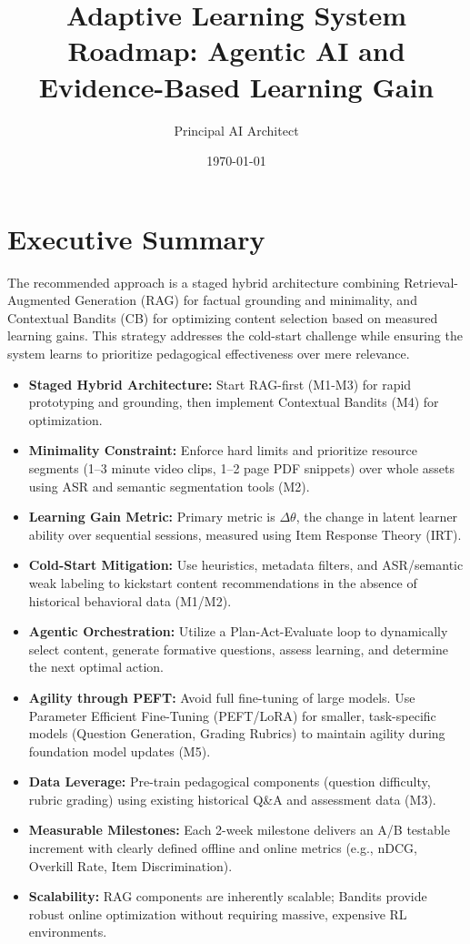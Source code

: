 \documentclass[12pt]{article}
\title{\textbf{Adaptive Learning System Roadmap: Agentic AI and Evidence-Based Learning Gain}}
\author{Principal AI Architect}
\date{\today}
\begin{document}
\maketitle
\thispagestyle{empty}

\tableofcontents
\newpage

\section{Executive Summary}

The recommended approach is a staged hybrid architecture combining Retrieval-Augmented Generation (RAG) for factual grounding and minimality, and Contextual Bandits (CB) for optimizing content selection based on measured learning gains. This strategy addresses the cold-start challenge while ensuring the system learns to prioritize pedagogical effectiveness over mere relevance.

\begin{itemize}[noitemsep]
    \item \textbf{Staged Hybrid Architecture:} Start RAG-first (M1-M3) for rapid prototyping and grounding, then implement Contextual Bandits (M4) for optimization.
    \item \textbf{Minimality Constraint:} Enforce hard limits and prioritize resource segments (1--3 minute video clips, 1--2 page PDF snippets) over whole assets using ASR and semantic segmentation tools (M2).
    \item \textbf{Learning Gain Metric:} Primary metric is $\Delta\theta$, the change in latent learner ability over sequential sessions, measured using Item Response Theory (IRT).
    \item \textbf{Cold-Start Mitigation:} Use heuristics, metadata filters, and ASR/semantic weak labeling to kickstart content recommendations in the absence of historical behavioral data (M1/M2).
    \item \textbf{Agentic Orchestration:} Utilize a Plan-Act-Evaluate loop to dynamically select content, generate formative questions, assess learning, and determine the next optimal action.
    \item \textbf{Agility through PEFT:} Avoid full fine-tuning of large models. Use Parameter Efficient Fine-Tuning (PEFT/LoRA) for smaller, task-specific models (Question Generation, Grading Rubrics) to maintain agility during foundation model updates (M5).
    \item \textbf{Data Leverage:} Pre-train pedagogical components (question difficulty, rubric grading) using existing historical Q\&A and assessment data (M3).
    \item \textbf{Measurable Milestones:} Each 2-week milestone delivers an A/B testable increment with clearly defined offline and online metrics (e.g., nDCG, Overkill Rate, Item Discrimination).
    \item \textbf{Scalability:} RAG components are inherently scalable; Bandits provide robust online optimization without requiring massive, expensive RL environments.
\end{itemize}
\end{document}
